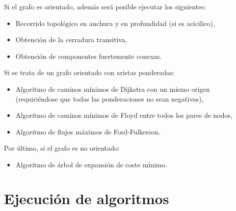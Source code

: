 \documentclass{book}
\begin{document}
	\noindent Si el grafo es orientado, además será posible ejecutar los siguientes:
	\medskip

	\begin{itemize}
		\renewcommand{\labelitemi}{\scriptsize\tiny$\blacksquare$} 
		\itemsep=2pt \topsep=0pt \partopsep=0pt \parskip=0pt \parsep=0pt
		
		\item Recorrido topológico en anchura y en profundidad (si es acícilico),

		\item Obtención de la cerradura transitiva,

		\item Obtención de componentes fuertemente conexas.

	\end{itemize}
	\medskip

	\noindent Si se trata de un grafo orientado con aristas ponderadas:
	\medskip

	\begin{itemize}
		\renewcommand{\labelitemi}{\scriptsize\tiny$\blacksquare$} 
		\itemsep=2pt \topsep=0pt \partopsep=0pt \parskip=0pt \parsep=0pt
		
		\item Algoritmo de caminos mínimos de Dijkstra con un mismo origen (requiriéndose que todas las ponderaciones no sean negativas),

		\item Algoritmo de caminos mínimos de Floyd entre todos los pares de nodos,

		\item Algoritmo de flujos máximos de Ford-Fulkerson.

	\end{itemize}
	\medskip

	\noindent Por último, si el grafo es no orientado:
	\medskip

	\begin{itemize}
		\renewcommand{\labelitemi}{\scriptsize\tiny$\blacksquare$} 
		\itemsep=2pt \topsep=0pt \partopsep=0pt \parskip=0pt \parsep=0pt
		
		\item Algoritmo de árbol de expansión de coste mínimo.

	\end{itemize}
	\medskip



\section{Ejecución de algoritmos}
\end{document}
